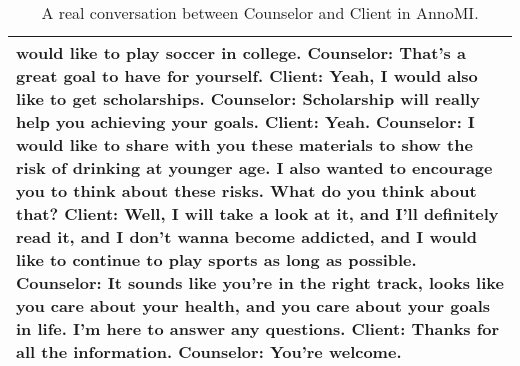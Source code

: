 \begin{table*}[tb]
\begin{tabularx}{\textwidth}{X}
would like to play soccer in college. \newline Counselor: That's a great goal to have for yourself. \newline Client: Yeah, I would also like to get scholarships. \newline Counselor: Scholarship will really help you achieving your goals. \newline Client: Yeah. \newline Counselor: I would like to share with you these materials to show the risk of drinking at younger age. I also wanted to encourage you to think about these risks. What do you think about that? \newline Client: Well, I will take a look at it, and I'll definitely read it, and I don't wanna become addicted, and I would like to continue to play sports as long as possible. \newline Counselor: It sounds like you're in the right track, looks like you care about your health, and you care about your goals in life. I'm here to answer any questions. \newline Client: Thanks for all the information. \newline Counselor: You're welcome.  \\ \bottomrule
\end{tabularx}
\caption{A real conversation between Counselor and Client in AnnoMI.}
\label{tab:real conv}
\end{table*}

